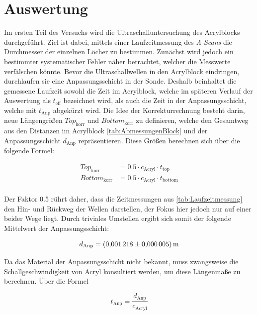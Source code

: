 \section{Auswertung}
\label{sec:Auswertung}

\noindent Im ersten Teil des Versuchs wird die Ultraschalluntersuchung des Acrylblocks durchgeführt. Ziel ist dabei, mittels 
einer Laufzeitmessung des \emph{A-Scans} die Durchmesser der einzelnen Löcher zu bestimmen. Zunächst wird jedoch ein bestimmter 
systematischer Fehler näher betrachtet, welcher die Messwerte verfälschen könnte. Bevor die Ultraschallwellen in den Acrylblock 
eindringen, durchlaufen sie eine Anpassungsschicht in der Sonde. Deshalb beinhaltet die gemessene Laufzeit sowohl die Zeit im 
Acrylblock, welche im späteren Verlauf der Auswertung als $t_\text{eff}$ bezeichnet wird, als auch die Zeit in der Anpassungsschicht,
welche mit $t_\text{Anp}$ abgekürzt wird. Die Idee der Korrekturrechnung besteht darin, neue Längengrößen $Top_\text{korr}$ und $Bottom_\text{korr}$
zu definieren, welche den Gesamtweg aus den Distanzen im Acrylblock \ref{tab:AbmessungenBlock} und der Anpassungsschicht $d_\text{Anp}$
repräsentieren. Diese Größen berechnen sich über die folgende Formel:

\begin{align*}
    Top_\text{korr} &= 0.5 \cdot c_\text{Acryl} \cdot t_\text{top}\\
    Bottom_\text{korr} &= 0.5 \cdot c_\text{Acryl} \cdot t_\text{bottom}\\
\end{align*}

\noindent Der Faktor 0.5 rührt daher, dass die Zeitmessungen aus \ref{tab:Laufzeitmessung} den Hin- und Rückweg der Wellen darstellen,
der Fokus hier jedoch nur auf einer beider Wege liegt. Durch triviales Umstellen ergibt sich somit der folgende Mittelwert der 
Anpassungsschicht:

\begin{equation*}
    d_\text{Anp} = \qty{0.001218\pm0.000005}{\meter}
\end{equation*}

\noindent Da das Material der Anpassungsschicht nicht bekannt, muss zwangsweise die Schallgeschwindigkeit von Acryl konsultiert 
werden, um diese Längenmaße zu berechnen. Über die Formel 

\begin{equation*}
    t_\text{Anp} = \frac{d_\text{Anp}}{c_\text{Acryl}}
\end{equation*}

